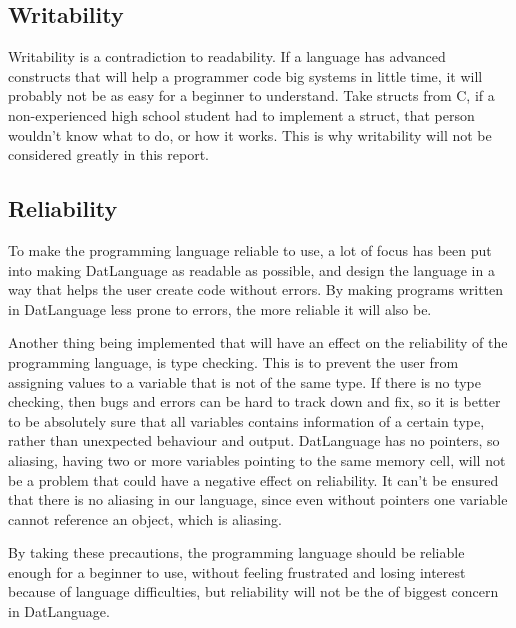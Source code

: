\subsection{Writability}
Writability is a contradiction to readability. If a language has advanced constructs that will help a programmer code big systems in little time, it will probably not be as easy for a beginner to understand. Take structs from C, if a non-experienced high school student had to implement a struct, that person wouldn't know what to do, or how it works. This is why writability will not be considered greatly in this report.

\subsection{Reliability}
To make the programming language reliable to use, a lot of focus has been put into making DatLanguage as readable as possible, and design the language in a way that helps the user create code without errors. By making programs written in DatLanguage less prone to errors, the more reliable it will also be.

Another thing being implemented that will have an effect on the reliability of the programming language, is type checking. This is to prevent the user from assigning values to a variable that is not of the same type. If there is no type checking, then bugs and errors can be hard to track down and fix, so it is better to be absolutely sure that all variables contains information of a certain type, rather than unexpected behaviour and output. 
DatLanguage has no pointers, so aliasing, having two or more variables pointing to the same memory cell, will not be a problem that could have a negative effect on reliability. It can't be ensured that there is no aliasing in our language, since even without pointers one variable cannot reference an object, which is aliasing. 

By taking these precautions, the programming language should be reliable enough for a beginner to use, without feeling frustrated and losing interest because of language difficulties, but reliability will not be the of biggest concern in DatLanguage. 



